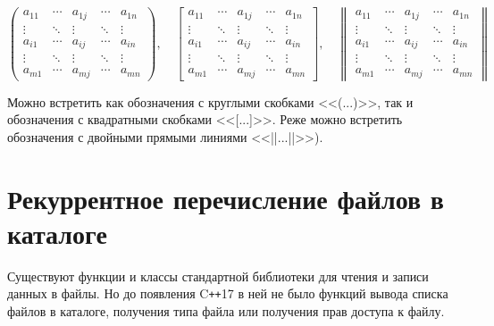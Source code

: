 \documentclass[a4paper, 12pt]{article} %
\begin{document}
\begin{equation*}
    \begin{pmatrix}
        a_{11} & \cdots & a_{1j} & \cdots & a_{1n} \\
        \vdots & \ddots & \vdots & \ddots & \vdots \\
        a_{i1} & \cdots & a_{ij} & \cdots & a_{in} \\
        \vdots & \ddots & \vdots & \ddots & \vdots \\
        a_{m1} & \cdots & a_{mj} & \cdots & a_{mn}
    \end{pmatrix},\quad\left[\begin{array}{ccccc}
            a_{11} & \cdots & a_{1j} & \cdots & a_{1n} \\
            \vdots & \ddots & \vdots & \ddots & \vdots \\
            a_{i1} & \cdots & a_{ij} & \cdots & a_{in} \\
            \vdots & \ddots & \vdots & \ddots & \vdots \\
            a_{m1} & \cdots & a_{mj} & \cdots & a_{mn}
        \end{array}\right],\quad\left\|\begin{array}{ccccc}
        a_{11} & \cdots & a_{1j} & \cdots & a_{1n} \\
        \vdots & \ddots & \vdots & \ddots & \vdots \\
        a_{i1} & \cdots & a_{ij} & \cdots & a_{in} \\
        \vdots & \ddots & \vdots & \ddots & \vdots \\
        a_{m1} & \cdots & a_{mj} & \cdots & a_{mn}
    \end{array}\right\|
\end{equation*}

Можно встретить как обозначения с круглыми скобками <<(...)>>, так и обозначения с квадратными скобками <<[...]>>. Реже можно встретить обозначения с двойными прямыми линиями <<||...||>>).

\clearpage

\section*{Рекуррентное перечисление файлов в каталоге}
Существуют функции и классы стандартной библиотеки для чтения и записи данных в файлы. Но до появления C\texttt{++}17 в ней не было функций вывода списка файлов в каталоге, получения типа файла или получения прав доступа к файлу.
\end{document}
